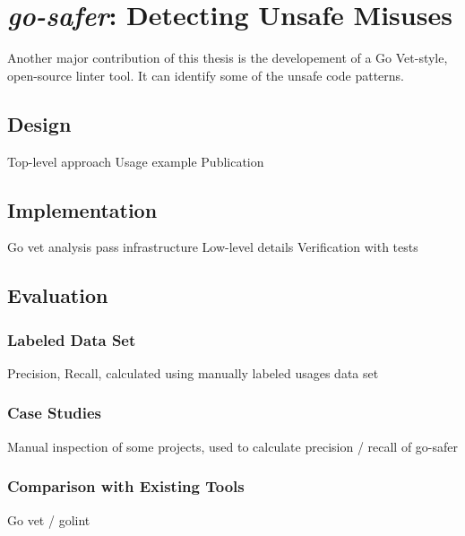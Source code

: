 \chapter{\textit{go-safer}: Detecting Unsafe Misuses}\label{ch:go-safer}

Another major contribution of this thesis is the developement of a Go Vet-style, open-source linter tool. It can
identify some of the unsafe code patterns.




\section{Design}

Top-level approach
Usage example
Publication




\section{Implementation}

Go vet analysis pass infrastructure
Low-level details
Verification with tests


\section{Evaluation}

\subsection{Labeled Data Set}

Precision, Recall, calculated using manually labeled usages data set


\subsection{Case Studies}

Manual inspection of some projects, used to calculate precision / recall of go-safer


\subsection{Comparison with Existing Tools}

Go vet / golint
